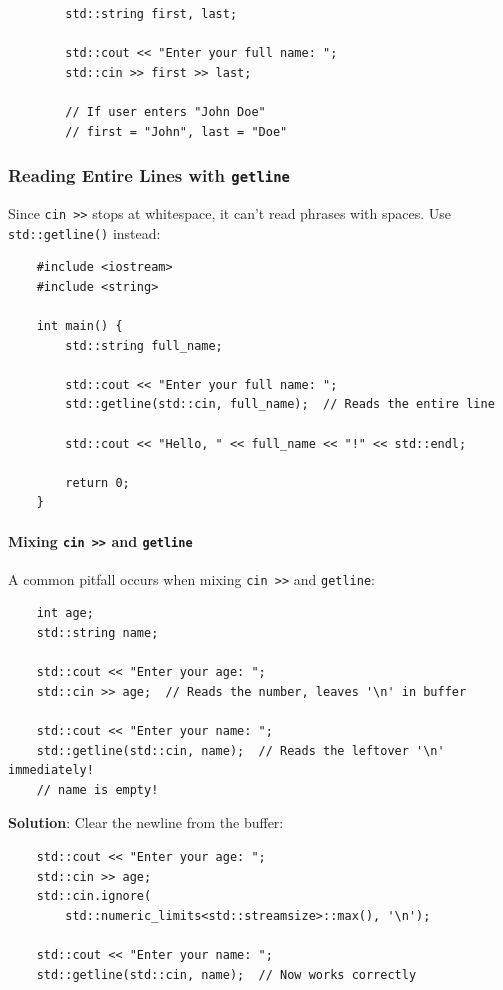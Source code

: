 \begin{example}{\leavevmode}
	
	\begin{lstlisting}
		std::string first, last;
		
		std::cout << "Enter your full name: ";
		std::cin >> first >> last;
		
		// If user enters "John Doe"
		// first = "John", last = "Doe"
	\end{lstlisting}
\end{example}

\subsubsection{Reading Entire Lines with \texttt{getline}}

Since \texttt{cin >>} stops at whitespace, it can't read phrases with spaces. Use \texttt{std::getline()} instead:

\begin{lstlisting}
	#include <iostream>
	#include <string>
	
	int main() {
		std::string full_name;
		
		std::cout << "Enter your full name: ";
		std::getline(std::cin, full_name);  // Reads the entire line
		
		std::cout << "Hello, " << full_name << "!" << std::endl;
		
		return 0;
	}
\end{lstlisting}

\paragraph{Mixing \texttt{cin >>} and \texttt{getline}}

A common pitfall occurs when mixing \texttt{cin >>} and \texttt{getline}:

\begin{lstlisting}
	int age;
	std::string name;
	
	std::cout << "Enter your age: ";
	std::cin >> age;  // Reads the number, leaves '\n' in buffer
	
	std::cout << "Enter your name: ";
	std::getline(std::cin, name);  // Reads the leftover '\n' immediately!
	// name is empty!
\end{lstlisting}

\textbf{Solution}: Clear the newline from the buffer:

\begin{lstlisting}
	std::cout << "Enter your age: ";
	std::cin >> age;
	std::cin.ignore(
		std::numeric_limits<std::streamsize>::max(), '\n');
	
	std::cout << "Enter your name: ";
	std::getline(std::cin, name);  // Now works correctly
\end{lstlisting}


